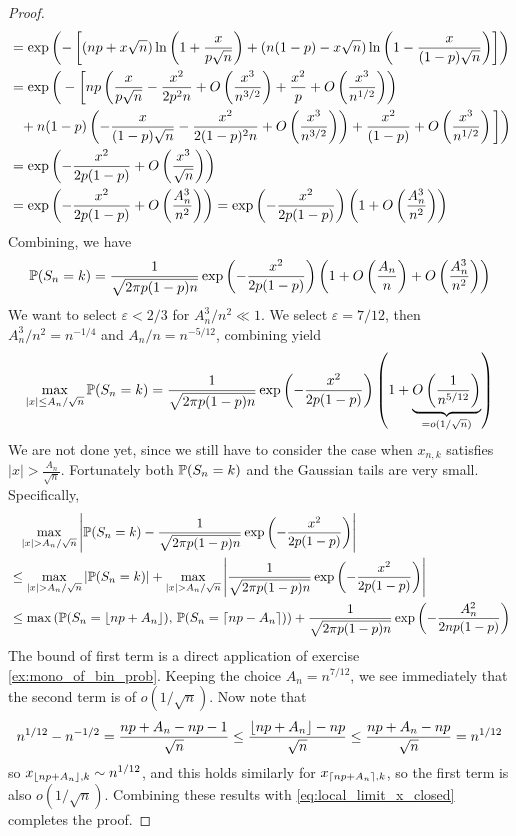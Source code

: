 \begin{proof}
{\begin{align*}
    &= \exp\left( -\left[ (np+x\sqrt{n}) \ln\left( 1+\frac{x}{p\sqrt{n}} \right) + (n(1-p) - x\sqrt{n}) \ln\left( 1-\frac{x}{(1-p)\sqrt{n}} \right) \right] \right) \\
    &= \exp\bigg( -\bigg[ np\left( \frac{x}{p\sqrt{n}} - \frac{x^2}{2p^2 n} + O\left( \frac{x^3}{n^{3/2}} \right) + \frac{x^2}{p} + O\left( \frac{x^3}{n^{1/2}} \right) \right) \\
    &\phantom{=}+ n(1-p) \left( -\frac{x}{(1-p)\sqrt{n}} - \frac{x^2}{2(1-p)^2 n} + O\left( \frac{x^3}{n^{3/2}} \right) \right) + \frac{x^2}{(1-p)} + O\left( \frac{x^3}{n^{1/2}} \right) \bigg] \bigg) \\
    &= \exp\left( -\frac{x^2}{2p(1-p)} + O\left( \frac{x^3}{\sqrt{n}} \right) \right) \\
    &= \exp\left( -\frac{x^2}{2p(1-p)} + O\left( \frac{A_n^3}{n^2} \right) \right)
    = \exp\left( -\frac{x^2}{2p(1-p)} \right)\left( 1+O\left( \frac{A_n^3}{n^2} \right) \right)
\end{align*}
}
Combining, we have
\begin{equation}
    \mathbb{P}(S_n = k) = \frac{1}{\sqrt{2\pi p(1-p)n}} \exp\left( -\frac{x^2}{2p(1-p)} \right) \left( 1+O\left( \frac{A_n}{n} \right)+O\left( \frac{A_n^3}{n^2} \right) \right)
\end{equation}
We want to select $\varepsilon < 2/3$ for $A^3_n/n^2 \ll 1$. We select $\varepsilon = 7/12$, then $A_n^3/n^2 = n^{-1/4}$ and $A_n/n = n^{-5/12}$, combining yield
\begin{equation} \label{eq:local_limit_x_closed}
    \max_{|x|\leq A_n/\sqrt{n}} \mathbb{P}(S_n = k) = \frac{1}{\sqrt{2\pi p(1-p)n}} \exp\left( -\frac{x^2}{2p(1-p)} \right) \left( 1+ \underbrace{O\left( \frac{1}{n^{5/12}} \right)}_{=o(1/\sqrt{n})} \right)
\end{equation}
We are not done yet, since we still have to consider the case when $x_{n,k}$ satisfies $|x| > \frac{A_n}{\sqrt{n}}$. Fortunately both $\mathbb{P}(S_n = k)$ and the Gaussian tails are very small. Specifically,
\begin{align*}
    &\phantom{=} \max_{|x|>A_n/\sqrt{n}} \abs{\p(S_n = k) - \frac{1}{\sqrt{2\pi p(1-p)n}} \exp\bracket{-\frac{x^2}{2p(1-p)}}} \\ 
    &\leq 
    \max_{|x|>A_n/\sqrt{n}} \abs{\p(S_n = k)} + 
    \max_{|x|>A_n/\sqrt{n}} \abs{\frac{1}{\sqrt{2\pi p(1-p)n}} \exp\bracket{-\frac{x^2}{2p(1-p)}}} \\
    &\leq \max\bracket{\p(S_n = \lfloor np+A_n \rfloor), \, \p(S_n = \lceil np-A_n \rceil)} + \frac{1}{\sqrt{2\pi p(1-p)n}} \exp\bracket{-\frac{A_n^2}{2np(1-p)}}
\end{align*}
The bound of first term is a direct application of exercise \ref{ex:mono_of_bin_prob}. Keeping the choice $A_n = n^{7/12}$, we see immediately that the second term is of $o(1/\sqrt{n})$. Now note that 
\begin{equation}
    n^{1/12} - n^{-1/2} = \frac{np+A_n-np-1}{\sqrt{n}} \leq \frac{\left\lfloor np+A_n \right\rfloor-np}{\sqrt{n}} \leq \frac{np+A_n-np}{\sqrt{n}} = n^{1/12}
\end{equation}
so $x_{\left\lfloor np+A_n \right\rfloor,k} \sim n^{1/12}$, and this holds similarly for $x_{\left\lceil np+A_n \right\rceil,k}$, so the first term is also $o(1/\sqrt{n})$. Combining these results with \eqref{eq:local_limit_x_closed} completes the proof.
\end{proof}

